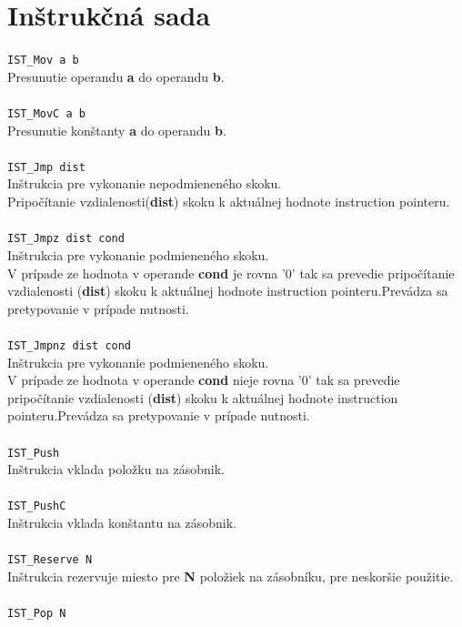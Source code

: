 \documentclass[12pt,a4paper,titlepage,final]{article}
\begin{document}
\section{Inštrukčná sada}

\texttt{IST\_Mov a b}\\
Presunutie operandu \textbf{a} do operandu \textbf{b}. \\
\\\texttt{IST\_MovC a b} \\
Presunutie konštanty \textbf{a} do operandu \textbf{b}. \\
\\\texttt{IST\_Jmp dist}\\
Inštrukcia pre vykonanie nepodmieneného skoku.\\
Pripočítanie vzdialenosti(\textbf{dist}) skoku k aktuálnej hodnote instruction
pointeru.\\
\\\texttt{IST\_Jmpz dist cond}\\
Inštrukcia pre vykonanie podmieneného skoku.\\
V prípade ze hodnota v operande \textbf{cond} je rovna '0' tak sa prevedie
pripočítanie vzdialenosti (\textbf{dist}) skoku k aktuálnej hodnote instruction
pointeru.Prevádza sa pretypovanie v prípade nutnosti.\\
\\\texttt{IST\_Jmpnz dist cond}\\
Inštrukcia pre vykonanie podmieneného skoku.\\
V prípade ze hodnota v operande \textbf{cond} nieje rovna '0' tak sa prevedie
pripočítanie vzdialenosti (\textbf{dist}) skoku k aktuálnej hodnote instruction
pointeru.Prevádza sa pretypovanie v prípade nutnosti.\\
\\\texttt{IST\_Push}\\
Inštrukcia vklada položku na zásobnik.\\
\\\texttt{IST\_PushC}\\
Inštrukcia vklada konštantu na zásobnik.\\
\\\texttt{IST\_Reserve N}\\
Inštrukcia rezervuje miesto pre \textbf{N} položiek na zásobníku, pre neskoršie
 použitie.\\
\\\texttt{IST\_Pop N}\\
\end{document}

